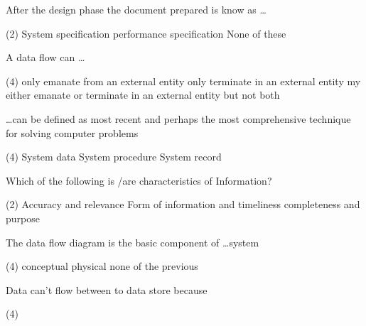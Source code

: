 \documentclass{article}
\begin{document}
\begin{questions}
\begin{exercise}
        After the design phase the document prepared is know as \dots
        \begin{choice}(2)
            \choice System specification
            \choice performance specification
            \choice {}
            \choice None of these
        \end{choice}
    \end{exercise}
    \begin{exercise}
        A data flow can \dots
        \begin{choice}(4)
            \choice only emanate from an external entity
            \choice only terminate in an external entity
            \choice {}
            \choice my either emanate or terminate in an external entity but not both
        \end{choice}
    \end{exercise}
    \begin{exercise}
        \dots can be defined as most recent and perhaps the most comprehensive technique for solving computer problems
        \begin{choice}(4)
            \choice {}
            \choice System data
            \choice System procedure
            \choice System record
        \end{choice}
    \end{exercise}
    \begin{exercise}
        Which of the following is /are characteristics of Information?
        \begin{choice}(2)
            \choice Accuracy and relevance
            \choice Form of information and timeliness
            \choice completeness and purpose
            \choice {}
        \end{choice}
    \end{exercise}
    \begin{exercise}
        The data flow diagram is the basic component of \dots system
        \begin{choice}(4)
            \choice conceptual
            \choice {}
            \choice physical
            \choice none of the previous
        \end{choice}
    \end{exercise}
    \begin{exercise}
        Data can't flow between to data store because
        \begin{choice}(4)

\end{choice}
\end{exercise}
\end{questions}
\end{document}
